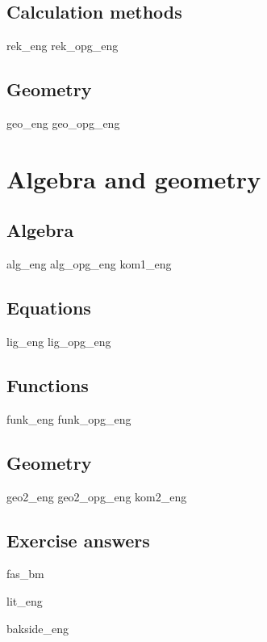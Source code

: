 \chapter{Calculation methods} \label{Rekneartane}
\newpage
{rek_eng}
{rek_opg_eng}

\chapter{Geometry}
\newpage
{geo_eng}
{geo_opg_eng}

\part{Algebra and geometry \label{Del2}}
\chapter{Algebra}
\newpage
{alg_eng}
{alg_opg_eng}
\newpage
{kom1_eng}

\chapter{Equations \label{Likningar}}
\newpage
{lig_eng}
{lig_opg_eng}

\chapter{Functions \label{Funksjoner}}
{funk_eng}
{funk_opg_eng}

\chapter{Geometry}
\newpage
{geo2_eng}
{geo2_opg_eng}
\newpage
{kom2_eng}

\newpage
{}
{}
\chapter*{Exercise answers}
{fas_bm}

{lit_eng}
{\printindex {}
	}
{bakside_eng}













